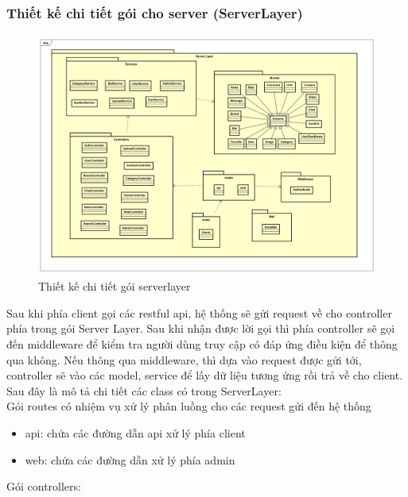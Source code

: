 \documentclass[../DoAn.tex]{subfiles}
\begin{document}
\subsubsection{Thiết kế chi tiết gói cho server (ServerLayer)}
\begin{figure}[H]
    \centering
    \includegraphics[width=11.4cm,height=8.0cm]{Hinhve/serverlayer.png}
    \caption{Thiết kế chi tiết gói serverlayer}
    \label{fig:Fig45}
\end{figure}
Sau khi phía client gọi các restful api, hệ thống sẽ gửi request về cho controller phía trong gói Server Layer. Sau khi nhận được lời gọi thì phía controller sẽ gọi đến middleware để kiểm tra người dùng truy cập có đáp ứng điều kiện để thông qua không. Nếu thông qua middleware, thì dựa vào request được gửi tới, controller sẽ vào các model, service để lấy dữ liệu tương ứng rồi trả về cho client.\\ 
Sau đây là mô tả chi tiết các class có trong ServerLayer:\\
Gói routes có nhiệm vụ xử lý phân luồng cho các request gửi đến hệ thống
\begin{itemize}
    \item api: chứa các đường dẫn api xử lý phía client
    \item web: chứa các đường dẫn xử lý phía admin
\end{itemize}
Gói controllers:
\end{document}
